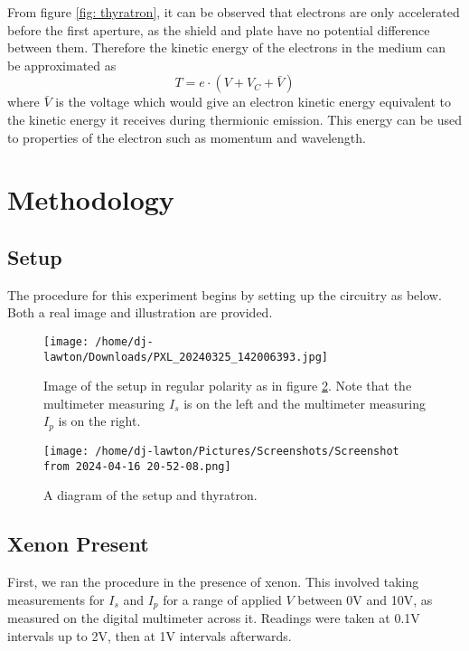 \documentclass{article}
\begin{document}
\indent From figure \ref{fig: thyratron}, it can be observed that electrons are only accelerated before the first aperture, as the shield and plate have no potential difference between them. Therefore the kinetic energy of the electrons in the medium can be approximated as
\begin{equation}
T = e\cdot (V + V_C+ \bar{V})
\label{eq: total energy}
\end{equation}
where $\bar{V}$ is the voltage which would give an electron kinetic energy equivalent to the kinetic energy it receives during thermionic emission. This energy can be used to properties of the electron such as momentum and wavelength.\\
\section{Methodology}
\subsection{Setup}
The procedure for this experiment begins by setting up the circuitry as below. Both a real image and illustration are provided.
\begin{figure}[H]
\begin{center}
\texttt{[image: /home/dj-lawton/Downloads/PXL\_20240325\_142006393.jpg]}
\caption{\label{fig:ImageSetup}Image of the setup in regular polarity as in figure \ref{fig:DiagramSetup}. Note that the multimeter measuring $I_s$ is on the left and the multimeter measuring $I_p$ is on the right.}
\end{center}
\end{figure}
\begin{figure}[H]
\begin{center}
\texttt{[image: /home/dj-lawton/Pictures/Screenshots/Screenshot from 2024-04-16 20-52-08.png]}
\caption{\label{fig:DiagramSetup}A diagram of the setup and thyratron.}
\end{center}
\end{figure}
\subsection{Xenon Present}
First, we ran the procedure in the presence of xenon. This involved taking measurements for $I_s$ and $I_p$ for a range of applied $V$ between 0V and 10V, as measured on the digital multimeter across it. Readings were taken at 0.1V intervals up to 2V, then at 1V intervals afterwards.
\end{document}
